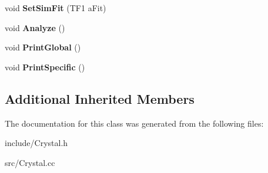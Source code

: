 \begin{DoxyCompactItemize}
\item 
\hypertarget{classCrystal_ab93ab8100f52f7bbb1eae56c78f8ca48}{void {\bfseries Set\+Sim\+Fit} (T\+F1 a\+Fit)}\label{classCrystal_ab93ab8100f52f7bbb1eae56c78f8ca48}

\item 
\hypertarget{classCrystal_a9b84060cc87f2940c6860cd906a3d49d}{void {\bfseries Analyze} ()}\label{classCrystal_a9b84060cc87f2940c6860cd906a3d49d}

\item 
\hypertarget{classCrystal_a3a63627bb261a091eb4f166f455ce268}{void {\bfseries Print\+Global} ()}\label{classCrystal_a3a63627bb261a091eb4f166f455ce268}

\item 
\hypertarget{classCrystal_a12cf58149ed3037247f27a924c70d411}{void {\bfseries Print\+Specific} ()}\label{classCrystal_a12cf58149ed3037247f27a924c70d411}

\end{DoxyCompactItemize}
\subsection*{Additional Inherited Members}


The documentation for this class was generated from the following files\+:\begin{DoxyCompactItemize}
\item 
include/Crystal.\+h\item 
src/Crystal.\+cc\end{DoxyCompactItemize}
